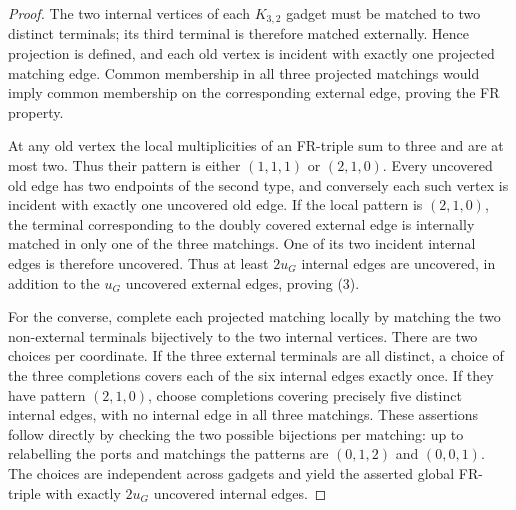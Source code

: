 \documentclass[11pt]{article}
\begin{document}
\begin{proof}
The two internal vertices of each $K_{3,2}$ gadget must be matched to two distinct terminals; its third terminal is therefore matched externally. Hence projection is defined, and each old vertex is incident with exactly one projected matching edge. Common membership in all three projected matchings would imply common membership on the corresponding external edge, proving the FR property.

At any old vertex the local multiplicities of an FR-triple sum to three and are at most two. Thus their pattern is either $(1,1,1)$ or $(2,1,0)$. Every uncovered old edge has two endpoints of the second type, and conversely each such vertex is incident with exactly one uncovered old edge. If the local pattern is $(2,1,0)$, the terminal corresponding to the doubly covered external edge is internally matched in only one of the three matchings. One of its two incident internal edges is therefore uncovered. Thus at least $2u_G$ internal edges are uncovered, in addition to the $u_G$ uncovered external edges, proving (3).

For the converse, complete each projected matching locally by matching the two non-external terminals bijectively to the two internal vertices. There are two choices per coordinate. If the three external terminals are all distinct, a choice of the three completions covers each of the six internal edges exactly once. If they have pattern $(2,1,0)$, choose completions covering precisely five distinct internal edges, with no internal edge in all three matchings. These assertions follow directly by checking the two possible bijections per matching: up to relabelling the ports and matchings the patterns are $(0,1,2)$ and $(0,0,1)$. The choices are independent across gadgets and yield the asserted global FR-triple with exactly $2u_G$ uncovered internal edges.
\end{proof}
\end{document}
